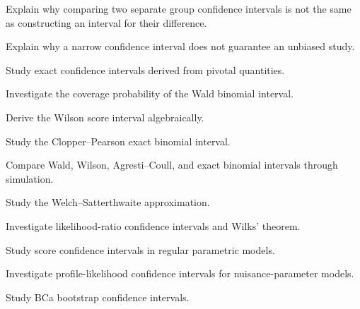 \begin{exercise}[3]
Explain why comparing two separate group confidence intervals is not the
same as constructing an interval for their difference.
\end{exercise}

\begin{exercise}[3]
Explain why a narrow confidence interval does not guarantee an unbiased
study.
\end{exercise}

\begin{exercise}[4]
Study exact confidence intervals derived from pivotal quantities.
\end{exercise}

\begin{exercise}[4]
Investigate the coverage probability of the Wald binomial interval.
\end{exercise}

\begin{exercise}[4]
Derive the Wilson score interval algebraically.
\end{exercise}

\begin{exercise}[4]
Study the Clopper--Pearson exact binomial interval.
\end{exercise}

\begin{exercise}[4]
Compare Wald, Wilson, Agresti--Coull, and exact binomial intervals through
simulation.
\end{exercise}

\begin{exercise}[4]
Study the Welch--Satterthwaite approximation.
\end{exercise}

\begin{exercise}[4]
Investigate likelihood-ratio confidence intervals and Wilks' theorem.
\end{exercise}

\begin{exercise}[4]
Study score confidence intervals in regular parametric models.
\end{exercise}

\begin{exercise}[4]
Investigate profile-likelihood confidence intervals for nuisance-parameter
models.
\end{exercise}

\begin{exercise}[4]
Study BCa bootstrap confidence intervals.
\end{exercise}


